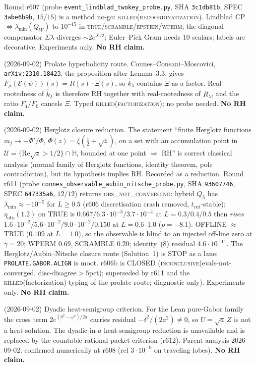 \documentclass[11pt]{article}
\theoremstyle{definition}
\theoremstyle{remark}
\begin{document}
\noindent Round r607 (probe \texttt{event\_lindblad\_twokey\_probe.py},
SHA \texttt{3c1db81b}, SPEC \texttt{3abe6b9b}, $15/15$) is a method
no-go: \textsc{killed(recoordinatization)}.  Lindblad CP
$\Leftrightarrow\lambda_{\min}(Q_W)$ to $10^{-15}$ in
\textsc{true}/\textsc{scramble}/\textsc{epstein}/\textsc{wperm};
the diagonal compensator $\Sigma\lambda$ diverges $\sim 2e^{X/2}$;
Euler--Pick Gram needs $10$ scalars; labels are decorative.
Experiments only.  \textbf{No RH claim.}

\noindent (2026-09-02) Prolate hyperbolicity route.  Connes--Consani--Moscovici,
\texttt{arXiv:2310.18423}, the proposition after Lemma~3.3, gives
$F_\mu(\mathcal{E}(\psi))(s)=R(s)\cdot\Xi(s)$, so $\hat k_\lambda$
contains $\Xi$ as a factor.  Real-rootedness of $\hat k_\lambda$ is
therefore RH together with real-rootedness of $R_\lambda$, and the
ratio $F_4/F_0$ cancels $\Xi$.  Typed
\textsc{killed(factorization)}; no probe needed.
\textbf{No RH claim.}

\noindent (2026-09-02) Herglotz closure reduction.  The statement
``finite Herglotz functions $m_j\to-\Phi'/\Phi$,
$\Phi(z)=\xi(\tfrac12+\sqrt{z})$, on a set with an accumulation point
in $\mathcal{U}=\{\mathrm{Re}\sqrt{z}>1/2\}\cap\mathbb{H}$, bounded at
one point $\Rightarrow$ RH'' is correct classical analysis (normal
family of Herglotz functions, identity theorem, pole contradiction),
but its hypothesis implies RH.  Recorded as a reduction.
Round r611 (probe \texttt{connes\_observable\_aubin\_nitsche\_probe.py},
SHA \texttt{93607746}, SPEC \texttt{647335a6}, $12/12$) returns
\textsc{obs\_not\_converging}: hybrid $Q_\lambda$ has
$\lambda_{\min}\approx-10^{-5}$ for $L\ge0.5$ (r606 discretisation
crash removed, $t_{\mathrm{cut}}$-stable);
$\eta_{\mathrm{obs}}(1.2)$ on TRUE is $0.667/6.3\cdot10^{-3}/3.7\cdot10^{-4}$
at $L=0.3/0.4/0.5$ then \emph{rises}
$1.6\cdot10^{-2}/5.6\cdot10^{-2}/9.0\cdot10^{-2}/0.150$ at $L=0.6$--$1.0$
($p=-8.1$).  OFFLINE $\approx$ TRUE ($0.109$ at $L=1.0$), so the
observable is blind to an injected off-line zero at $\gamma=20$;
WPERM $0.69$, SCRAMBLE $0.20$; identity~(8) residual $4.6\cdot10^{-11}$.
The Herglotz/Aubin--Nitsche closure route (Solution~1) is STOP as a
lane; \texttt{PROLATE.GABOR.ALIGN} is moot.  r606b is CLOSED
(\textsc{inconclusive}(evals-not-converged, disc-disagree$>5$pct);
superseded by r611 and the \textsc{killed}(factorization) typing of
the prolate route; diagnostic only).  Experiments only.
\textbf{No RH claim.}

\noindent (2026-09-02) Dyadic heat-semigroup criterion.  For the Lean
pure-Gabor family the cross term $2e^{(\delta^2-\omega^2)/2a}$ carries
residual $-\delta^2/(2a^2)\ne0$, so $U=\sqrt{a}\,Z$ is not a heat
solution.  The dyadic-in-$a$ heat-semigroup reduction is unavailable
and is replaced by the countable rational-packet criterion (r612).
Parent analysis 2026-09-02; confirmed numerically at r608 (rel $3\cdot10^{-9}$
on traveling lobes).  \textbf{No RH claim.}
\end{document}
